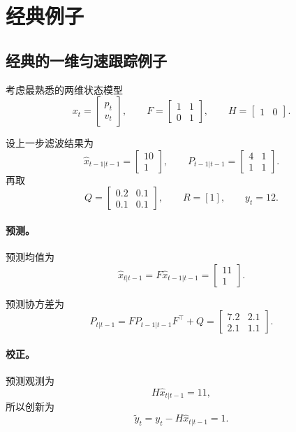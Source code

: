 \documentclass[12pt,a4paper]{ctexart}
\begin{document}
\section{经典例子}\label{app:classic-examples}

\subsection{经典的一维匀速跟踪例子}\label{app:classic-1d}

考虑最熟悉的两维状态模型
\[
x_t =
\begin{bmatrix}
p_t\\
v_t
\end{bmatrix},
\qquad
F =
\begin{bmatrix}
1 & 1\\
0 & 1
\end{bmatrix},
\qquad
H =
\begin{bmatrix}
1 & 0
\end{bmatrix}.
\]

设上一步滤波结果为
\[
\hat{x}_{t-1|t-1} =
\begin{bmatrix}
10\\
1
\end{bmatrix},
\qquad
P_{t-1|t-1} =
\begin{bmatrix}
4 & 1\\
1 & 1
\end{bmatrix}.
\]
再取
\[
Q =
\begin{bmatrix}
0.2 & 0.1\\
0.1 & 0.1
\end{bmatrix},
\qquad
R = [1],
\qquad
y_t = 12.
\]

\paragraph{预测。}
预测均值为
\[
\hat{x}_{t|t-1}
=
F\hat{x}_{t-1|t-1}
=
\begin{bmatrix}
11\\
1
\end{bmatrix}.
\]

预测协方差为
\[
P_{t|t-1}
=
F P_{t-1|t-1} F^\top + Q
=
\begin{bmatrix}
7.2 & 2.1\\
2.1 & 1.1
\end{bmatrix}.
\]

\paragraph{校正。}
预测观测为
\[
H\hat{x}_{t|t-1} = 11,
\]
所以创新为
\[
\tilde{y}_t = y_t - H\hat{x}_{t|t-1} = 1.
\]
\end{document}
